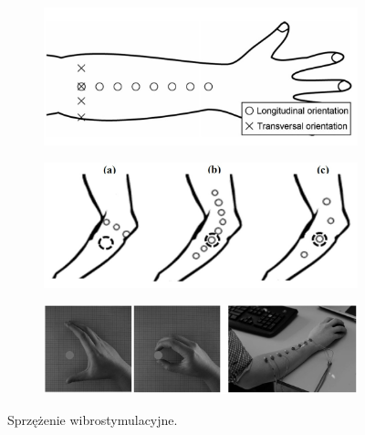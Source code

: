 \documentclass[8pt]{beamer}
\begin{document}
		\begin{frame}
		\begin{figure}
				\begin{center}
        			\begin{subfigure}[b]{0.5\textwidth}
                		\includegraphics[width=\textwidth]{graphics/vibro_orientation.jpg}
                		\label{graph:g5}
        			\end{subfigure}%
        			\begin{subfigure}[b]{0.5\textwidth}
                		\includegraphics[width=\textwidth]{graphics/vibro_possib.jpg}
                		\label{graph:g6}
        			\end{subfigure}%
        			\newline
        			\begin{subfigure}[b]{0.7\textwidth}
                		\includegraphics[width=\textwidth]{graphics/vibro_photo.jpg}
                		\label{graph:g6}
        			\end{subfigure}%
				\caption{Sprzężenie wibrostymulacyjne. \cite{tenore} }
				\end{center}
			\end{figure}
		\end{frame}
		
\end{document}
